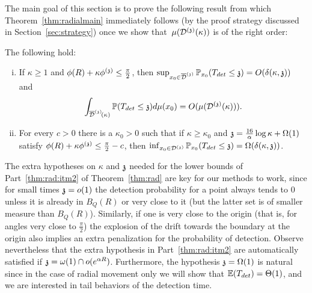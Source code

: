 The main goal of this section is to prove the following result from which Theorem~\ref{thm:radialmain} immediately follows (by the proof strategy discussed in Section~\ref{sec:strategy}) once we show that~$\mu(\dt(\kappa))$ is of the right order:
\begin{theorem}\label{thm:rad} 
The following hold:
\begin{enumerate}[(i)]
\item If $\kappa\geq 1$ and $\phi(R)+\kappa\phi^{(\ss)}\leq \frac{\pi}{2}$, then $\sup_{x_0 \in \ndt}\PP_{x_0}(T_{det}\leq\ss)=O(\delta(\kappa,\ss))$ and
\[
\int_{\ndt\!(\kappa)}\P(T_{det}\leq\ss)d\mu(x_0) = O(\mu(\dt(\kappa))). 
\]
\item\label{thm:rad:itm2} For every $c>0$ there is a $\kappa_0 >0$ such that if $\kappa\ge\kappa_0$ and $\ss= \frac{16}{\alpha}\log \kappa+\Omega(1)$ satisfy $\phi(R)+\kappa\phi^{(\ss)}\leq \frac{\pi}{2}-c$, then $\inf_{x_0 \in \dt}\PP_{x_0}(T_{det}\leq\ss)=\Omega(\delta(\kappa,\ss))$.
\end{enumerate}
\end{theorem}


\begin{comment}
\begin{remark}
The upper bound on $\ss$ implicit in the hypothesis $\phi(R)+\phi^{(\ss)}\leq\frac{\pi}{2}$ stems from the fact that for $\ss > \frac{\pi}{2}e^{\alpha R}$ 
the first probability of the above theorem is $e^{-\Omega(n)}$. The same conclusion follows from the fact that having zero points in a Poisson point process of intensity $n$ occurs with probability $e^{-\Theta(n)}$, hence for such values of $\ss$ the upper bound becomes trivial.
\end{remark}
\end{comment} 

\begin{remark}
The extra hypotheses on $\kappa$ and $\ss$ needed for the lower bounds of Part~\eqref{thm:rad:itm2} of Theorem~\ref{thm:rad} %
are key for our methods to work, %
since for small times $\ss= o(1)$ the detection probability for a point always tends to $0$ unless it is already in $B_Q(R)$ or very close to it (but the latter set is of smaller measure than $B_Q(R)$). Similarly, if one is very close to the origin (that is, for angles very close to $\frac{\pi}{2}$) the explosion of the drift towards the boundary at the origin also implies an extra penalization for the probability of detection. Observe nevertheless that the extra hypothesis in Part~\eqref{thm:rad:itm2} are automatically satisfied if $\ss=\omega(1)\cap o(e^{\alpha R})$.
Furthermore, the hypothesis $\ss =\Omega(1)$ is natural since in the case of radial movement only we will show that $\EE(T_{det})=\Theta(1)$, and we are interested in tail behaviors of the detection time.
\end{remark}

